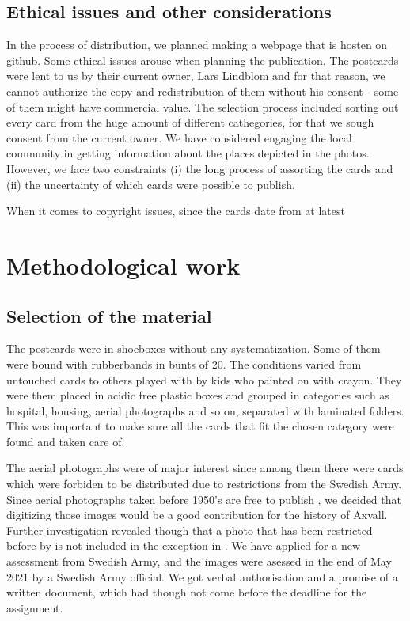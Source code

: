 \documentclass[12 pt]{paper}
\begin{document}
\subsection{Ethical issues and other considerations}

In the process of distribution, we planned making a webpage that is hosten on github. Some ethical issues \autocite[cf.][]{manzuch2017} arouse when planning the publication. The postcards were lent to us by their current owner, Lars Lindblom and for that reason, we cannot authorize the copy and redistribution of them without his consent - some of them might have commercial value. The selection process included sorting out every card from the huge amount of different cathegories, for that we sough consent from the  current owner. We have considered engaging the local community \autocite[cf.][]{hss2020, manzuch2017} in getting information about the places depicted in the photos. However, we face two constraints (i) the long process of assorting the cards and (ii) the uncertainty of which cards were possible to publish. 

When it comes to copyright issues, since the cards date from at latest

\section{Methodological work}%
\subsection{Selection of the material}

The postcards were in shoeboxes without any systematization. Some of them were bound with rubberbands in bunts of 20. The conditions varied from untouched cards to others played with by kids who painted on with crayon. They were them placed in acidic free plastic boxes and grouped in categories such as hospital, housing, aerial photographs and so on, separated with laminated folders. This was important to make sure all the cards that fit the chosen category were found and taken care of.
 
The aerial photographs were of major interest since among them there were cards  which were forbiden to be distributed due to restrictions from the Swedish Army. Since aerial photographs taken before 1950's are free to publish \autocite[][kap. 3, 3§]{lantm2018}, we decided that digitizing those images would be a good contribution for the history of Axvall. Further investigation revealed though that a photo that has been restricted before by is not included in the exception in \textcite{lantm2018}. We have applied for a new assessment from Swedish Army, and the images were asessed in the end of May 2021 by a Swedish Army official. We got verbal authorisation and a promise of a written document, which had though not come before the deadline for the assignment. 
\end{document}
